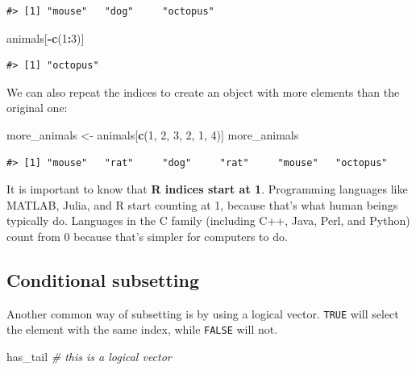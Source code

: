 \documentclass[
]{book}
\newenvironment{Shaded}{\begin{snugshade}}{\end{snugshade}}
\newcommand{\CommentTok}[1]{\textcolor[rgb]{0.56,0.35,0.01}{\textit{#1}}}
\newcommand{\DecValTok}[1]{\textcolor[rgb]{0.00,0.00,0.81}{#1}}
\newcommand{\FunctionTok}[1]{\textcolor[rgb]{0.13,0.29,0.53}{\textbf{#1}}}
\newcommand{\NormalTok}[1]{#1}
\newcommand{\OtherTok}[1]{\textcolor[rgb]{0.56,0.35,0.01}{#1}}
\newcommand{\SpecialCharTok}[1]{\textcolor[rgb]{0.81,0.36,0.00}{\textbf{#1}}}
\begin{document}
\begin{verbatim}
#> [1] "mouse"   "dog"     "octopus"
\end{verbatim}

\begin{Shaded}
\begin{Highlighting}[]
\NormalTok{animals[}\SpecialCharTok{{-}}\FunctionTok{c}\NormalTok{(}\DecValTok{1}\SpecialCharTok{:}\DecValTok{3}\NormalTok{)]}
\end{Highlighting}
\end{Shaded}

\begin{verbatim}
#> [1] "octopus"
\end{verbatim}

We can also repeat the indices to create an object with more elements than the
original one:

\begin{Shaded}
\begin{Highlighting}[]
\NormalTok{more\_animals }\OtherTok{\textless{}{-}}\NormalTok{ animals[}\FunctionTok{c}\NormalTok{(}\DecValTok{1}\NormalTok{, }\DecValTok{2}\NormalTok{, }\DecValTok{3}\NormalTok{, }\DecValTok{2}\NormalTok{, }\DecValTok{1}\NormalTok{, }\DecValTok{4}\NormalTok{)]}
\NormalTok{more\_animals}
\end{Highlighting}
\end{Shaded}

\begin{verbatim}
#> [1] "mouse"   "rat"     "dog"     "rat"     "mouse"   "octopus"
\end{verbatim}

It is important to know that \textbf{R indices start at 1}. Programming languages like MATLAB,
Julia, and R start counting at 1, because that's what human beings typically do. Languages in the C family (including C++, Java, Perl, and Python) count from 0 because that's
simpler for computers to do.

\subsection{Conditional subsetting}\label{conditional-subsetting}

Another common way of subsetting is by using a logical vector. \texttt{TRUE} will
select the element with the same index, while \texttt{FALSE} will not.

\begin{Shaded}
\begin{Highlighting}[]
\NormalTok{has\_tail }\CommentTok{\# this is a logical vector}
\end{Highlighting}
\end{Shaded}
\end{document}
